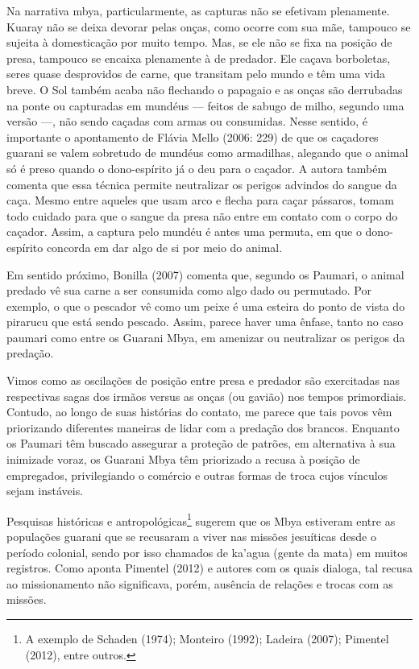 Na narrativa mbya, particularmente, as capturas não se efetivam
plenamente. Kuaray não se deixa devorar pelas onças, como ocorre com
sua mãe, tampouco se sujeita à domesticação por muito tempo. Mas, se
ele não se fixa na posição de presa, tampouco se encaixa plenamente à
de predador. Ele caçava borboletas, seres quase desprovidos de carne,
que transitam pelo mundo e têm uma vida breve. O Sol também acaba não
flechando o papagaio e as onças são derrubadas na ponte ou capturadas
em mundéus — feitos de sabugo de milho, segundo uma versão —, não sendo
caçadas com armas ou consumidas. Nesse sentido, é importante o
apontamento de Flávia Mello (2006: 229) de que os caçadores guarani se
valem sobretudo de mundéus como armadilhas, alegando que o animal só é
preso quando o dono-espírito já o deu para o caçador. A autora também
comenta que essa técnica permite neutralizar os perigos advindos do
sangue da caça. Mesmo entre aqueles que usam arco e flecha para caçar
pássaros, tomam todo cuidado para que o sangue da presa não entre em
contato com o corpo do caçador. Assim, a captura pelo mundéu é antes
uma permuta, em que o dono-espírito concorda em dar algo de si por meio
do animal.

Em sentido próximo, Bonilla (2007) comenta que, segundo os Paumari, o
animal predado vê sua carne a ser consumida como algo dado ou
permutado. Por exemplo, o que o pescador vê como um peixe é uma esteira
do ponto de vista do pirarucu que está sendo pescado. Assim, parece
haver uma ênfase, tanto no caso paumari como entre os Guarani Mbya, em
amenizar ou neutralizar os perigos da predação. 

Vimos como as oscilações de posição entre presa e predador são
exercitadas nas respectivas sagas dos irmãos versus as onças (ou
gavião) nos tempos primordiais. Contudo, ao longo de suas histórias do
contato, me parece que tais povos vêm priorizando diferentes maneiras
de lidar com a predação dos brancos. Enquanto os Paumari têm buscado
assegurar a proteção de patrões, em alternativa à sua inimizade voraz,
os Guarani Mbya têm priorizado a recusa à posição de empregados,
privilegiando o comércio e outras formas de troca cujos vínculos sejam
instáveis.

Pesquisas históricas e antropológicas\footnote{A exemplo de Schaden
(1974); Monteiro (1992); Ladeira (2007); Pimentel (2012), entre
outros.} sugerem que os Mbya estiveram entre as populações guarani que
se recusaram a viver nas missões jesuíticas desde o período colonial,
sendo por isso chamados de ka’agua (gente da mata) em muitos registros.
Como aponta Pimentel (2012) e autores com os quais dialoga, tal recusa
ao missionamento não significava, porém, ausência de relações e trocas
com as missões.


